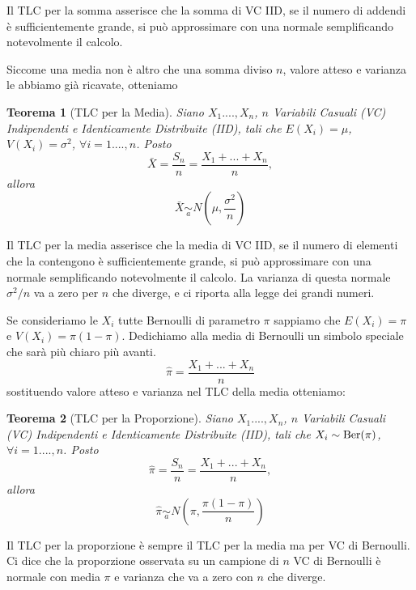 \documentclass[
  11pt,
]{book}
\theoremstyle{mytheoremstyle}
\newtheorem{theorem}{Teorema}[section]
\theoremstyle{mydefstyle}
\begin{document}
Il TLC per la somma asserisce che la somma di VC IID, se il numero di
addendi è sufficientemente grande, si può approssimare con una normale
semplificando notevolmente il calcolo.

Siccome una media non è altro che una somma diviso \(n\), valore atteso e
varianza le abbiamo già ricavate, otteniamo

\begin{info}

\begin{theorem}[TLC per la Media]
Siano \(X_1....,X_n\), \(n\) Variabili Casuali (VC) Indipendenti e
Identicamente Distribuite (IID), tali che \(E(X_i)=\mu\),
\(V(X_i)=\sigma^2\), \(\forall i=1....,n\). Posto
\[\bar X =\frac {S_n} n = \frac{X_1+...+X_n}n,\] allora
\[\bar X\operatorname*{\sim}_{a} N\left(\mu,\frac{\sigma^2}n\right)\]
\end{theorem}

\end{info}

Il TLC per la media asserisce che la media di VC IID, se il numero di
elementi che la contengono è sufficientemente grande, si può
approssimare con una normale semplificando notevolmente il calcolo. La
varianza di questa normale \(\sigma^2/n\) va a zero per \(n\) che diverge, e
ci riporta alla legge dei grandi numeri.

Se consideriamo le \(X_i\) tutte Bernoulli di parametro \(\pi\) sappiamo che
\(E(X_i)=\pi\) e \(V(X_i)=\pi(1-\pi)\). Dedichiamo alla media di Bernoulli
un simbolo speciale che sarà più chiaro più avanti.
\[
\hat \pi=\frac{X_1+...+X_n}{n}
\]
sostituendo valore atteso e varianza
nel TLC della media otteniamo:

\begin{info}

\begin{theorem}[TLC per la Proporzione]
Siano \(X_1....,X_n\), \(n\) Variabili Casuali (VC) Indipendenti e
Identicamente Distribuite (IID), tali che \(X_i\sim\text{\rm Ber}(\pi)\),
\(\forall i=1....,n\). Posto
\[\hat\pi =\frac {S_n} n = \frac{X_1+...+X_n}n,\] allora
\[\hat\pi\operatorname*{\sim}_{a} N\left(\pi,\frac{\pi(1-\pi)}n\right)\]
\end{theorem}

\end{info}

Il TLC per la proporzione è sempre il TLC per la media ma per VC di
Bernoulli. Ci dice che la proporzione osservata su un campione di \(n\) VC
di Bernoulli è normale con media \(\pi\) e varianza che va a zero con \(n\)
che diverge.
\end{document}
